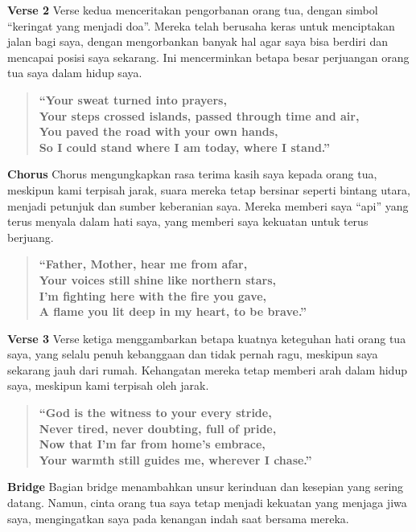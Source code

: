 \documentclass[
  letterpaper,
  DIV=11,
  numbers=noendperiod]{scrreprt}
\begin{document}
\textbf{Verse 2} Verse kedua menceritakan pengorbanan orang tua, dengan
simbol ``keringat yang menjadi doa''. Mereka telah berusaha keras untuk
menciptakan jalan bagi saya, dengan mengorbankan banyak hal agar saya
bisa berdiri dan mencapai posisi saya sekarang. Ini mencerminkan betapa
besar perjuangan orang tua saya dalam hidup saya.

\begin{quote}
\textbf{``Your sweat turned into prayers,\\
Your steps crossed islands, passed through time and air,\\
You paved the road with your own hands,\\
So I could stand where I am today, where I stand.''}
\end{quote}

\textbf{Chorus} Chorus mengungkapkan rasa terima kasih saya kepada orang
tua, meskipun kami terpisah jarak, suara mereka tetap bersinar seperti
bintang utara, menjadi petunjuk dan sumber keberanian saya. Mereka
memberi saya ``api'' yang terus menyala dalam hati saya, yang memberi
saya kekuatan untuk terus berjuang.

\begin{quote}
\textbf{``Father, Mother, hear me from afar,\\
Your voices still shine like northern stars,\\
I'm fighting here with the fire you gave,\\
A flame you lit deep in my heart, to be brave.''}
\end{quote}

\textbf{Verse 3} Verse ketiga menggambarkan betapa kuatnya keteguhan
hati orang tua saya, yang selalu penuh kebanggaan dan tidak pernah ragu,
meskipun saya sekarang jauh dari rumah. Kehangatan mereka tetap memberi
arah dalam hidup saya, meskipun kami terpisah oleh jarak.

\begin{quote}
\textbf{``God is the witness to your every stride,\\
Never tired, never doubting, full of pride,\\
Now that I'm far from home's embrace,\\
Your warmth still guides me, wherever I chase.''}
\end{quote}

\textbf{Bridge} Bagian bridge menambahkan unsur kerinduan dan kesepian
yang sering datang. Namun, cinta orang tua saya tetap menjadi kekuatan
yang menjaga jiwa saya, mengingatkan saya pada kenangan indah saat
bersama mereka.
\end{document}
